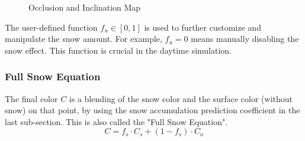 \documentclass{article}
\begin{document}
\begin{figure}[h]
  \centering
  \caption{Occlusion and Inclination Map}
  \label{fig:Maps}
\end{figure}

The user-defined function \( f_{u} \in [0, 1]\) is used to further customize and manipulate the snow amount. For example, 
\( f_{u}=0 \) means manually disabling the snow effect. This function is crucial in the daytime simulation.

\subsubsection {Full Snow Equation}
The final color \( C \) is a blending of the snow color and the surface color (without snow) on that point, by using the snow accumulation 
prediction coefficient in the last sub-section. This is also called the "Full Snow Equation".
\[
  C = f_{s} \cdot C_{s} + (1-f_{s}) \cdot C_{o}
\]
\end{document}
